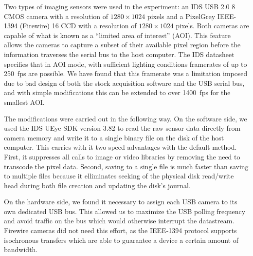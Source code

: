 Two types of imaging sensors were used in the experiment: an IDS USB 2.0
\SI{8}{\bit} CMOS camera with a resolution of $1280\times1024$ pixels and a PixelGrey
IEEE-1394 (Firewire) \SI{16}{\bit} CCD  with a resolution of
$1280\times1024$ pixels.
Both cameras are capable of what is known as a ``limited area of interest''
(AOI).  This feature allows the cameras to capture a subset of their
available pixel region before the information traverses the serial
bus to the host computer.  The IDS datasheet specifies that in AOI mode,
with sufficient lighting conditions framerates of up to \SI{250}{fps} are
possible.  We have found that this framerate was a limitation imposed due
to bad design of both the stock acquisition software and the USB serial
bus, and with simple modifications this can be extended to over
\SI{1400}{fps} for the smallest AOI.

The modifications were carried out in the following way.  On the software
side, we used the IDS UEye SDK version 3.82 to read the raw sensor data
directly from camera memory and write it to a single binary file on the
disk of the host computer.  This carries with it two speed advantages with
the default method.  First, it suppresses all calls to image or video
libraries by removing the need to transcode the pixel data.  Second, saving
to a single file is much faster than saving to multiple files because it
elliminates seeking of the physical disk read/write head during both file
creation and updating the disk's journal.  

On the hardware side, we found it necessary to assign each USB camera to
its own dedicated USB bus.  This allowed us to maximize the USB polling
frequency and avoid traffic on the bus which would otherwise interrupt the
datastream.  Firewire cameras did not need this effort, as the IEEE-1394
protocol supports isochronous transfers which are able to guarantee a
device a certain amount of bandwidth.

